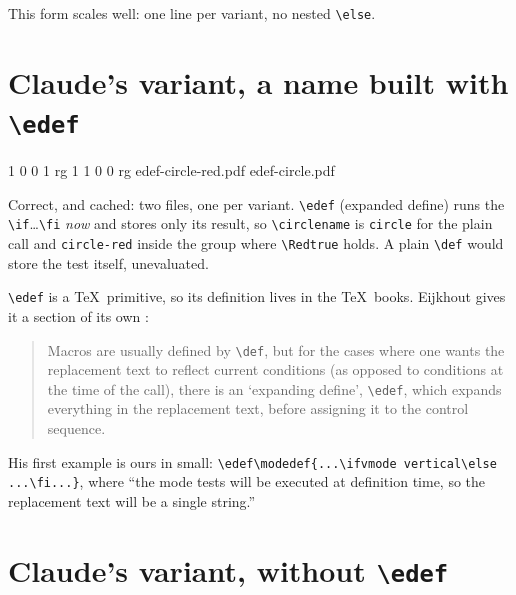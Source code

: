 \documentclass[11pt,a4paper]{article}
\let\lstinputlistingwhole
\renewcommand{}[2][]{\needspace{8\baselineskip}\lstinputlistingwhole[#1]{#2}}
\let\sectionalone\section
\renewcommand{\section}{\needspace{8\baselineskip}\sectionalone}
\newcommand{\cs}[1]{\texttt{\textbackslash #1}}
\newcommand{\flagtrue}[1]{\texttt{\lstflagtrue{#1}{}}}
\newcommand{\lstflagtrue}[2]{{\color{teal!80!black}\textbackslash #1}{\color{orange!85!black}true}}
\begin{document}
This form scales well: one line per variant, no nested \cs{else}.

\section{Claude's variant, a name built with \cs{edef}}\label{sec:edef}



\begin{cmdout}
   1 0 0 1 rg
   1 1 0 0 rg
edef-circle-red.pdf
edef-circle.pdf
\end{cmdout}

Correct, and cached: two files, one per variant. \cs{edef} (expanded define) runs the \cs{if}…\cs{fi} \emph{now} and stores only its result, so \cs{circlename} is \texttt{circle} for the plain call and \texttt{circle-red} inside the group where \flagtrue{Red} holds. A plain \cs{def} would store the test itself, unevaluated.

\cs{edef} is a \TeX\ primitive, so its definition lives in the \TeX\ books. Eijkhout gives it a section of its own \cite[§12.3.2 \textit{Total expansion: \cs{edef}}, p.~127]{tbt}:
\begin{quote}\small
Macros are usually defined by \cs{def}, but for the cases where one wants the replacement text to reflect current conditions (as opposed to conditions at the time of the call), there is an `expanding define', \cs{edef}, which expands everything in the replacement text, before assigning it to the control sequence.
\end{quote}
His first example is ours in small: \verb|\edef\modedef{...\ifvmode vertical\else ...\fi...}|, where ``the mode tests will be executed at definition time, so the replacement text will be a single string.''

\section{Claude's variant, without \cs{edef}}\label{sec:inline}


\end{document}

